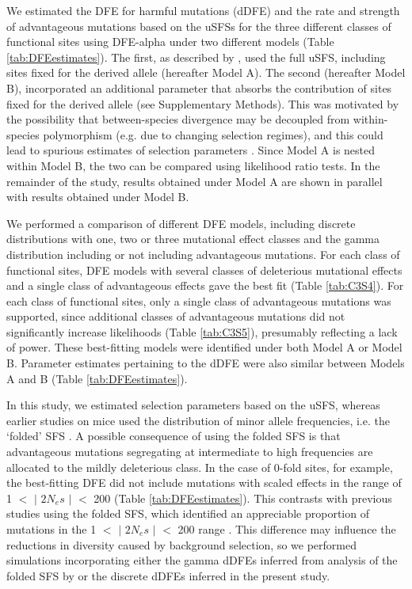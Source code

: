 	We estimated the DFE for harmful mutations (dDFE) and the rate and strength of advantageous mutations based on the uSFSs for the three different classes of functional sites using DFE-alpha under two different models (Table \ref{tab:DFEestimates}). The first, as described by \cite{RN210}, used the full uSFS, including sites fixed for the derived allele (hereafter Model A). The second (hereafter Model B), incorporated an additional parameter that absorbs the contribution of sites fixed for the derived allele (see Supplementary Methods). This was motivated by the possibility that between-species divergence may be decoupled from within-species polymorphism (e.g. due to changing selection regimes), and this could lead to spurious estimates of selection parameters \cite{RN165, RN354}. Since Model A is nested within Model B, the two can be compared using likelihood ratio tests. In the remainder of the study, results obtained under Model A are shown in parallel with results obtained under Model B. 

\linespread{1}

\linespread{2}

	We performed a comparison of different DFE models, including discrete distributions with one, two or three mutational effect classes and the gamma distribution including or not including advantageous mutations. For each class of functional sites, DFE models with several classes of deleterious mutational effects and a single class of advantageous effects gave the best fit (Table \ref{tab:C3S4}). For each class of functional sites, only a single class of advantageous mutations was supported, since additional classes of advantageous mutations did not significantly increase likelihoods (Table \ref{tab:C3S5}), presumably reflecting a lack of power. These best-fitting models were identified under both Model A or Model B. Parameter estimates pertaining to the dDFE were also similar between Models A and B (Table \ref{tab:DFEestimates}). 

	In this study, we estimated selection parameters based on the uSFS, whereas earlier studies on mice used the distribution of minor allele frequencies, i.e. the ‘folded’ SFS \citep{RN158, RN170, RN342, RN122, RN238}. A possible consequence of using the folded SFS is that advantageous mutations segregating at intermediate to high frequencies are allocated to the mildly deleterious class. In the case of 0-fold sites, for example, the best-fitting DFE did not include mutations with scaled effects in the range of 1 $<$ $\mid$ $2N_es$ $\mid$ $<$ 200 (Table \ref{tab:DFEestimates}). This contrasts with previous studies using the folded SFS, which identified an appreciable proportion of mutations in the 1 $<$ $\mid$ $2N_es$ $\mid$ $<$ 200 range \citep{RN122,RN178}. This difference may influence the reductions in diversity caused by background selection, so we performed simulations incorporating either the gamma dDFEs inferred from analysis of the folded SFS by \cite{RN122} or the discrete dDFEs inferred in the present study.
 

